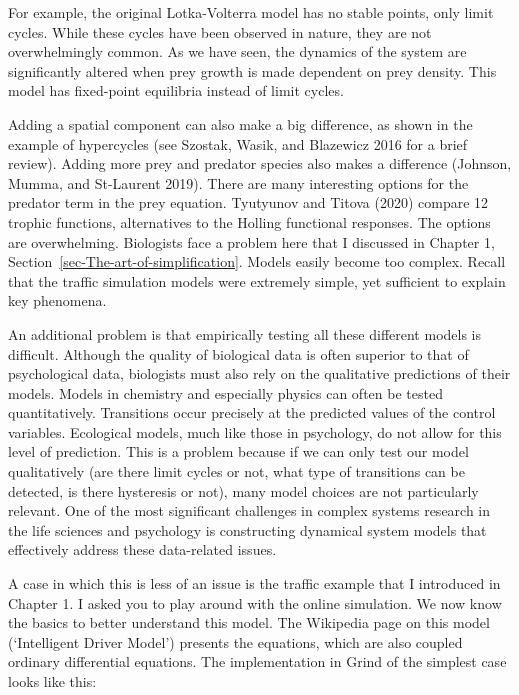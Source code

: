 \documentclass[
  a4paper,
  DIV=11,
  numbers=noendperiod]{scrreprt}
\begin{document}
For example, the original Lotka-Volterra model has no stable points,
only limit cycles. While these cycles have been observed in nature, they
are not overwhelmingly common. As we have seen, the dynamics of the
system are significantly altered when prey growth is made dependent on
prey density. This model has fixed-point equilibria instead of limit
cycles.

Adding a spatial component can also make a big difference, as shown in
the example of hypercycles (see Szostak, Wasik, and Blazewicz 2016 for a
brief review). Adding more prey and predator species also makes a
difference (Johnson, Mumma, and St-Laurent 2019). There are many
interesting options for the predator term in the prey equation.
Tyutyunov and Titova (2020) compare 12 trophic functions, alternatives
to the Holling functional responses. The options are overwhelming.
Biologists face a problem here that I discussed in Chapter 1,
Section~\ref{sec-The-art-of-simplification}. Models easily become too
complex. Recall that the traffic simulation models were extremely
simple, yet sufficient to explain key phenomena.

An additional problem is that empirically testing all these different
models is difficult. Although the quality of biological data is often
superior to that of psychological data, biologists must also rely on the
qualitative predictions of their models. Models in chemistry and
especially physics can often be tested quantitatively. Transitions occur
precisely at the predicted values of the control variables. Ecological
models, much like those in psychology, do not allow for this level of
prediction. This is a problem because if we can only test our model
qualitatively (are there limit cycles or not, what type of transitions
can be detected, is there hysteresis or not), many model choices are not
particularly relevant. One of the most significant challenges in complex
systems research in the life sciences and psychology is constructing
dynamical system models that effectively address these data-related
issues.

A case in which this is less of an issue is the traffic example that I
introduced in Chapter 1. I asked you to play around with the online
simulation. We now know the basics to better understand this model. The
Wikipedia page on this model (`Intelligent Driver Model') presents the
equations, which are also coupled ordinary differential equations. The
implementation in Grind of the simplest case looks like this:
\end{document}
